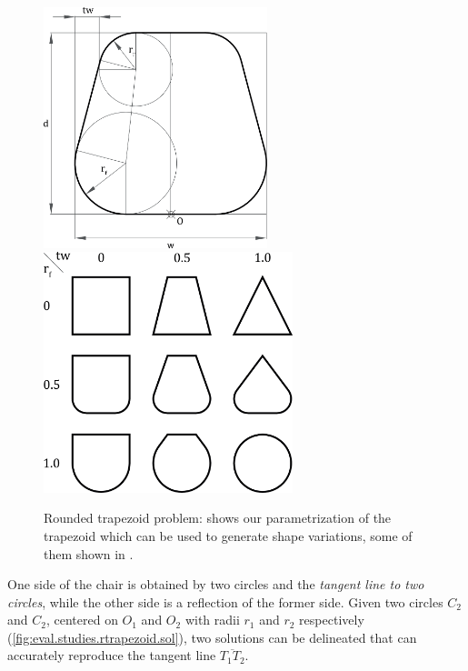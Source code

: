\begin{figure}[htb]
    {\includegraphics[height=7cm]{fig/rtrapezoid-problem-params}}
  \hfill
    {\includegraphics[height=7cm]{fig/rtrapezoid-problem-vars}}
  \caption[Rounded trapezoid problem]{Rounded trapezoid problem:
     shows our parametrization
    of the trapezoid which can be used to generate shape variations, some of
    them shown in .}%
  \label{fig:eval.studies.rtrapezoid.prob}
\end{figure}

One side of the chair is obtained by two circles and the \textit{tangent line to
two circles}, while the other side is a reflection of the former side.  Given
two circles $C_2$ and $C_2$, centered on $O_1$ and $O_2$ with radii $r_1$ and
$r_2$ respectively (\cref{fig:eval.studies.rtrapezoid.sol}), two solutions can
be delineated that can accurately reproduce the tangent line $\overline{T_1
T_2}$.

